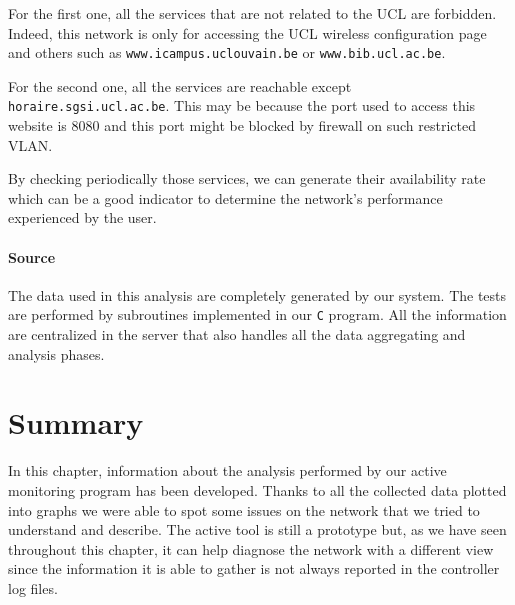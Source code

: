 For the first one, all the services that are not related to the UCL are forbidden. Indeed, this network is only for accessing the UCL wireless configuration page and others such as \texttt{www.icampus.uclouvain.be} or \texttt{www.bib.ucl.ac.be}.

For the second one, all the services are reachable except \texttt{horaire.sgsi.ucl.ac.be}. This may be because the port used to access this website is 8080 and this port might be blocked by firewall on such restricted  VLAN.

By checking periodically those services, we can generate their availability rate which can be a good indicator to determine the network's performance experienced by the user.


\paragraph*{Source} The data used in this analysis are completely generated by our system. The tests are performed by subroutines implemented in our \texttt{C} program. All the information are centralized in the server that also handles all the data aggregating and analysis phases.



\section{Summary}
In this chapter, information about the analysis performed by our active monitoring program has been developed. Thanks to all the collected data plotted into graphs we were able to spot some issues on the network that we tried to understand and describe. The active tool is still a prototype but, as we have seen throughout this chapter, it can help diagnose the network with a different view since the information it is able to gather is not always reported in the controller log files.
